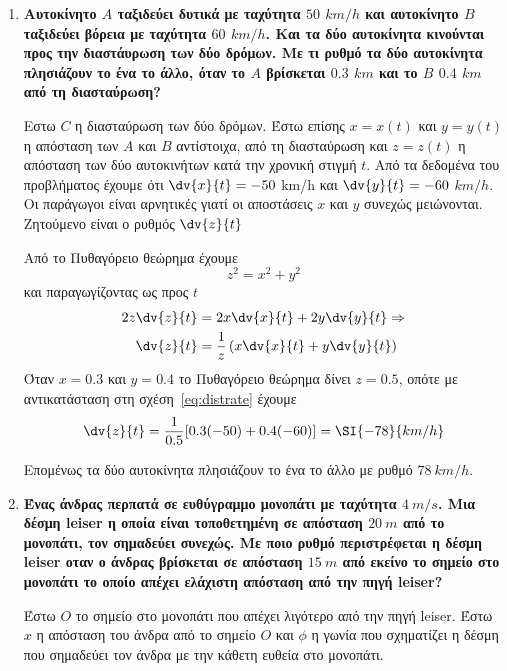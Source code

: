 \begin{enumerate}
\item  {\bfseries \boldmath Αυτοκίνητο $A$ ταξιδεύει δυτικά με ταχύτητα $50$
	$\si{km\per h}$ και αυτοκίνητο $B$ ταξιδεύει βόρεια με ταχύτητα $60$
$\si{km/h}$. Και τα δύο αυτοκίνητα κινούνται προς την διαστάυρωση των δύο δρόμων. Με τι ρυθμό τα δύο αυτοκίνητα πλησιάζουν το ένα το άλλο, όταν το $A$ βρίσκεται $0.3$ $\si{km}$ και το $B$ $0.4$ $\si{km}$ από τη διασταύρωση?}


	\vspace{\baselineskip}

	Εστω $C$ η διασταύρωση των δύο δρόμων. Έστω επίσης $x=x(t)$ και $y=y(t)$ η απόσταση των $A$ και $B$ αντίστοιχα, από τη διασταύρωση  και $z=z(t)$ η απόσταση των δύο αυτοκινήτων κατά την χρονική στιγμή $t$.
	Από τα δεδομένα του προβλήματος έχουμε ότι $\dv{x}{t}=-50$ \si{km/h} και
	$\dv{y}{t}=-60$ $\si{km/h}$. Οι παράγωγοι είναι αρνητικές γιατί οι αποστάσεις $x$ και $y$ συνεχώς μειώνονται. Ζητούμενο είναι ο ρυθμός $\dv{z}{t}$

	Από το Πυθαγόρειο θεώρημα έχουμε
	\[
		z^{2}=x^{2}+y^{2}
	\]
	και παραγωγίζοντας ως προς $t$
	\begin{align} \label{eq:distrate}
2z\dv{z}{t} &= 2x\dv{x}{t} + 2y\dv{y}{t} \notag \Rightarrow \\
\dv{z}{t} &= \frac{1}{z}\left(x\dv{x}{t}+y\dv{y}{t}\right)
\end{align}
Όταν $x=0.3$ και $y=0.4$ το Πυθαγόρειο θεώρημα δίνει $z=0.5$, οπότε με αντικατάσταση στη σχέση~\eqref{eq:distrate} έχουμε
\[
	\dv{z}{t}=\frac{1}{0.5}[0.3(-50)+0.4(-60)] = \SI{-78}{km/h}
\]

Επομένως τα δύο αυτοκίνητα πλησιάζουν το ένα το άλλο με ρυθμό $\SI{78}{km/h}$.



\item {\bfseries \boldmath Ένας άνδρας περπατά σε ευθύγραμμο μονοπάτι με
	ταχύτητα $\SI{4}{m/s}$. Μια δέσμη \textlatin{leiser} η οποία είναι τοποθετημένη σε απόσταση $\SI{20}{m}$ από το μονοπάτι, τον σημαδεύει συνεχώς. Με ποιο ρυθμό περιστρέφεται η δέσμη \textlatin{leiser} οταν ο άνδρας βρίσκεται σε απόσταση $\SI{15}{m}$ από εκείνο το σημείο στο μονοπάτι το οποίο απέχει ελάχιστη απόσταση από την πηγή \textlatin{leiser}?}


	\vspace{\baselineskip}
	Έστω $O$ το σημείο στο μονοπάτι που απέχει λιγότερο από την πηγή \textlatin{leiser}.
	Έστω $x$ η απόσταση του άνδρα από το σημείο $O$ και $\phi$ η γωνία που σχηματίζει η δέσμη που σημαδεύει τον άνδρα με την κάθετη ευθεία στο μονοπάτι.


\end{enumerate}
